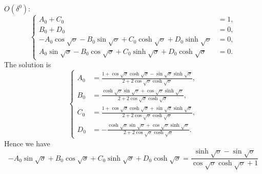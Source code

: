 \documentclass{article}
\begin{document}
\noindent
$O(\delta^0)$:
\begin{equation}
    \left\{\begin{aligned}
        A_0 + C_0 &= 1, \\
        B_0 + D_0 &= 0, \\
        - A_0 \cos{\sqrt{\sigma}} - B_0 \sin{\sqrt{\sigma}} + C_0 \cosh{\sqrt{\sigma}} + D_0 \sinh{\sqrt{\sigma}} &= 0, \\
        A_0 \sin{\sqrt{\sigma}} - B_0 \cos{\sqrt{\sigma}} + C_0 \sinh{\sqrt{\sigma}} + D_0 \cosh{\sqrt{\sigma}} &= 0.
    \end{aligned}\right.
\end{equation}
The solution is
\begin{equation}
    \left\{\begin{aligned}
        A_0 &= \frac{1 + \cos\sqrt{\sigma} \cosh\sqrt{\sigma} - \sin\sqrt{\sigma} \sinh\sqrt{\sigma} }{2 + 2 \cos\sqrt{\sigma} \cosh\sqrt{\sigma} }, \\
        B_0 &= \frac{\cosh\sqrt{\sigma} \sin\sqrt{\sigma} + \cos\sqrt{\sigma} \sinh\sqrt{\sigma} }{2 + 2 \cos\sqrt{\sigma} \cosh\sqrt{\sigma} }, \\
        C_0 &= \frac{1 + \cos\sqrt{\sigma} \cosh\sqrt{\sigma} + \sin\sqrt{\sigma} \sinh\sqrt{\sigma} }{2 + 2 \cos\sqrt{\sigma} \cosh\sqrt{\sigma} }, \\
        D_0 &= -\frac{\cosh\sqrt{\sigma} \sin\sqrt{\sigma} + \cos\sqrt{\sigma} \sinh\sqrt{\sigma} }{2 + 2 \cos\sqrt{\sigma} \cosh\sqrt{\sigma} }.
    \end{aligned}\right.
\end{equation}
Hence we have
\begin{equation}
    - A_0 \sin{\sqrt{\sigma}} + B_0 \cos{\sqrt{\sigma}} + C_0 \sinh{\sqrt{\sigma}} + D_0 \cosh{\sqrt{\sigma}} = \frac{\sinh\sqrt{\sigma }-\sin\sqrt{\sigma }}{\cos\sqrt{\sigma } \cosh\sqrt{\sigma }+1}
\end{equation}
\end{document}
